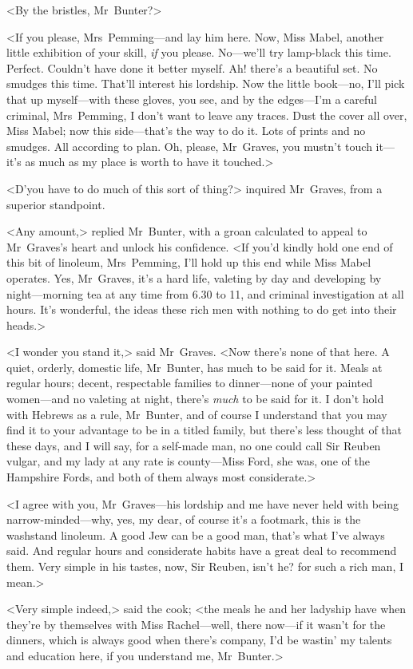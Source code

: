 <By the bristles, Mr~Bunter?>

<If you please, Mrs~Pemming—and lay him here. Now, Miss Mabel, another little exhibition of your skill, \emph{if} you please. No—we'll try lamp-black this time. Perfect. Couldn't have done it better myself. Ah! there's a beautiful set. No smudges this time. That'll interest his lordship. Now the little book—no, I'll pick that up myself—with these gloves, you see, and by the edges—I'm a careful criminal, Mrs~Pemming, I don't want to leave any traces. Dust the cover all over, Miss Mabel; now this side—that's the way to do it. Lots of prints and no smudges. All according to plan. Oh, please, Mr~Graves, you mustn't touch it—it's as much as my place is worth to have it touched.>

<D'you have to do much of this sort of thing?> inquired Mr~Graves, from a superior standpoint.

<Any amount,> replied Mr~Bunter, with a groan calculated to appeal to Mr~Graves's heart and unlock his confidence. <If you'd kindly hold one end of this bit of linoleum, Mrs~Pemming, I'll hold up this end while Miss Mabel operates. Yes, Mr~Graves, it's a hard life, valeting by day and developing by night—morning tea at any time from 6.30 to 11, and criminal investigation at all hours. It's wonderful, the ideas these rich men with nothing to do get into their heads.>

<I wonder you stand it,> said Mr~Graves. <Now there's none of that here. A quiet, orderly, domestic life, Mr~Bunter, has much to be said for it. Meals at regular hours; decent, respectable families to dinner—none of your painted women—and no valeting at night, there's \emph{much} to be said for it. I don't hold with Hebrews as a rule, Mr~Bunter, and of course I understand that you may find it to your advantage to be in a titled family, but there's less thought of that these days, and I will say, for a self-made man, no one could call Sir Reuben vulgar, and my lady at any rate is county—Miss Ford, she was, one of the Hampshire Fords, and both of them always most considerate.>

<I agree with you, Mr~Graves—his lordship and me have never held with being narrow-minded—why, yes, my dear, of course it's a footmark, this is the washstand linoleum. A good Jew can be a good man, that's what I've always said. And regular hours and considerate habits have a great deal to recommend them. Very simple in his tastes, now, Sir Reuben, isn't he? for such a rich man, I mean.>

<Very simple indeed,> said the cook; <the meals he and her ladyship have when they're by themselves with Miss Rachel—well, there now—if it wasn't for the dinners, which is always good when there's company, I'd be wastin' my talents and education here, if you understand me, Mr~Bunter.>

